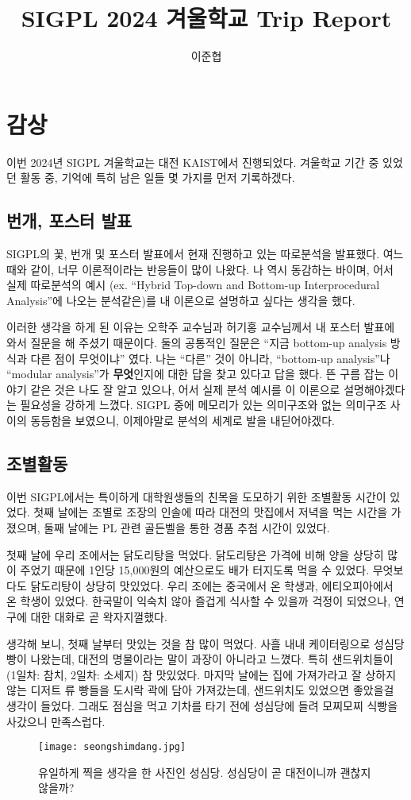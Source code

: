 \documentclass{article}
\title{SIGPL 2024 겨울학교 Trip Report}
\author{이준협}
\begin{document}
\maketitle
\section{감상}
이번 2024년 SIGPL 겨울학교는 대전 KAIST에서 진행되었다.
겨울학교 기간 중 있었던 활동 중, 기억에 특히 남은 일들 몇 가지를 먼저 기록하겠다.
\subsection{번개, 포스터 발표}
SIGPL의 꽃, 번개 및 포스터 발표에서 현재 진행하고 있는 따로분석을 발표했다.
여느 때와 같이, 너무 이론적이라는 반응들이 많이 나왔다.
나 역시 동감하는 바이며, 어서 실제 따로분석의 예시 (ex. ``Hybrid Top-down and Bottom-up Interprocedural Analysis''에 나오는 분석같은)를 내 이론으로 설명하고 싶다는 생각을 했다.

이러한 생각을 하게 된 이유는 오학주 교수님과 허기홍 교수님께서 내 포스터 발표에 와서 질문을 해 주셨기 때문이다.
둘의 공통적인 질문은 ``지금 bottom-up analysis 방식과 다른 점이 무엇이냐'' 였다.
나는 ``다른'' 것이 아니라, ``bottom-up analysis''나 ``modular analysis''가 \textbf{무엇}인지에 대한 답을 찾고 있다고 답을 했다.
뜬 구름 잡는 이야기 같은 것은 나도 잘 알고 있으나, 어서 실제 분석 예시를 이 이론으로 설명해야겠다는 필요성을 강하게 느꼈다.
SIGPL 중에 메모리가 있는 의미구조와 없는 의미구조 사이의 동등함을 보였으니, 이제야말로 분석의 세계로 발을 내딛어야겠다.
\subsection{조별활동}
이번 SIGPL에서는 특이하게 대학원생들의 친목을 도모하기 위한 조별활동 시간이 있었다.
첫째 날에는 조별로 조장의 인솔에 따라 대전의 맛집에서 저녁을 먹는 시간을 가졌으며, 둘째 날에는 PL 관련 골든벨을 통한 경품 추첨 시간이 있었다.

첫째 날에 우리 조에서는 닭도리탕을 먹었다.
닭도리탕은 가격에 비해 양을 상당히 많이 주었기 때문에 1인당 15,000원의 예산으로도 배가 터지도록 먹을 수 있었다.
무엇보다도 닭도리탕이 상당히 맛있었다.
우리 조에는 중국에서 온 학생과, 에티오피아에서 온 학생이 있었다.
한국말이 익숙치 않아 즐겁게 식사할 수 있을까 걱정이 되었으나, 연구에 대한 대화로 곧 왁자지껄했다.

생각해 보니, 첫째 날부터 맛있는 것을 참 많이 먹었다.
사흘 내내 케이터링으로 성심당 빵이 나왔는데, 대전의 명물이라는 말이 과장이 아니라고 느꼈다.
특히 샌드위치들이 (1일차: 참치, 2일차: 소세지) 참 맛있었다.
마지막 날에는 집에 가져가라고 잘 상하지 않는 디저트 류 빵들을 도시락 곽에 담아 가져갔는데, 샌드위치도 있었으면 좋았을걸 생각이 들었다.
그래도 점심을 먹고 기차를 타기 전에 성심당에 들려 모찌모찌 식빵을 사갔으니 만족스럽다.
\begin{figure}[h!]
  \centering
  \texttt{[image: seongshimdang.jpg]}
  \caption{유일하게 찍을 생각을 한 사진인 성심당. 성심당이 곧 대전이니까 괜찮지 않을까?}
\end{figure}
\end{document}
